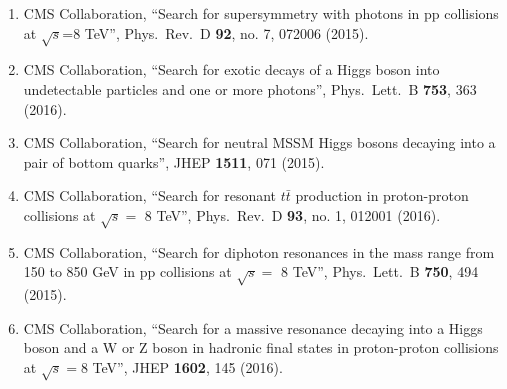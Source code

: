 \begin{itemize}
\begin{enumerate}
\item CMS Collaboration, ``Search for supersymmetry with photons in pp collisions at $\sqrt{s}$=8 TeV'', Phys.\ Rev.\ D {\bf 92}, no. 7, 072006 (2015).

\item CMS Collaboration, ``Search for exotic decays of a Higgs boson into undetectable particles and one or more photons'', Phys.\ Lett.\ B {\bf 753}, 363 (2016).

\item CMS Collaboration, ``Search for neutral MSSM Higgs bosons decaying into a pair of bottom quarks'', JHEP {\bf 1511}, 071 (2015).

\item CMS Collaboration, ``Search for resonant $t \bar t$ production in proton-proton collisions at $\sqrt s=$ 8 TeV'', Phys.\ Rev.\ D {\bf 93}, no. 1, 012001 (2016).

\item CMS Collaboration, ``Search for diphoton resonances in the mass range from 150 to 850 GeV in pp collisions at $\sqrt{s} =$ 8 TeV'', Phys.\ Lett.\ B {\bf 750}, 494 (2015).

\item CMS Collaboration, ``Search for a massive resonance decaying into a Higgs boson and a W or Z boson in hadronic final states in proton-proton collisions at $ \sqrt{s}=8 $ TeV'', JHEP {\bf 1602}, 145 (2016).


\end{enumerate}
\end{itemize}
